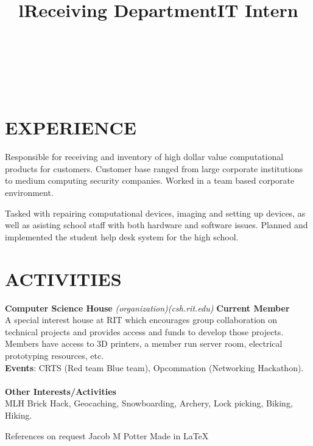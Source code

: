 \documentclass[line,margin]{res}
\begin{document}
\begin{resume}
\begin{format}
\title{l}\\
\\
\body\\
\end{format}
\section{EXPERIENCE}
\title{\textbf{Receiving Department}}
\begin{position}
    Responsible for receiving and inventory of high dollar value 
    computational products for customers. Customer base ranged from large 
    corporate institutions to medium computing security companies. Worked in a
    team based corporate environment.
\end{position}
\title{\textbf{IT Intern}}
\begin{position}
    Tasked with repairing computational devices, imaging and setting up devices, 
    as well as asisting school staff with both hardware and software issues. 
    Planned and implemented the student help desk system for the high 
    school.
\end{position}

\section{ACTIVITIES}
{\textbf{Computer Science House}}
{\sl (organization)}{\sl (csh.rit.edu)}\hfill
\textbf{Current Member}\\
A special interest house at RIT which encourages group collaboration on technical 
projects and provides access and funds to develop those projects. Members have 
access to 3D printers, a member run server room, electrical prototyping 
resources, etc.\\
\textbf{Events}: 
CRTS (Red team Blue team), Opcommation (Networking Hackathon).\\\\
\textbf{Other Interests/Activities}\\
MLH Brick Hack, Geocaching, Snowboarding, Archery, Lock picking, Biking, Hiking.

\end{resume}

\scriptsize{References on request} \hfill 
\scriptsize{Jacob M Potter} \hfill 
\scriptsize{Made in \LaTeX}
\end{document}
